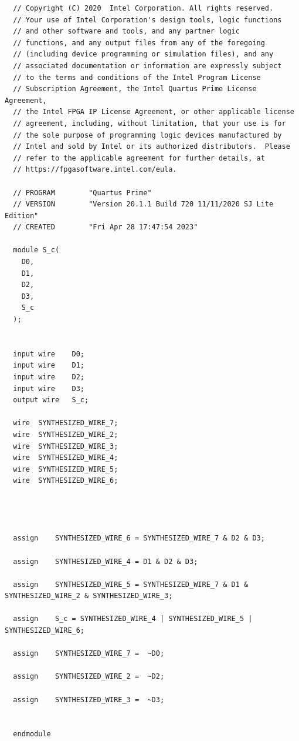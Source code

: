 \documentclass{article}
\begin{document}
\begin{lstlisting}
  // Copyright (C) 2020  Intel Corporation. All rights reserved.
  // Your use of Intel Corporation's design tools, logic functions 
  // and other software and tools, and any partner logic 
  // functions, and any output files from any of the foregoing 
  // (including device programming or simulation files), and any 
  // associated documentation or information are expressly subject 
  // to the terms and conditions of the Intel Program License 
  // Subscription Agreement, the Intel Quartus Prime License Agreement,
  // the Intel FPGA IP License Agreement, or other applicable license
  // agreement, including, without limitation, that your use is for
  // the sole purpose of programming logic devices manufactured by
  // Intel and sold by Intel or its authorized distributors.  Please
  // refer to the applicable agreement for further details, at
  // https://fpgasoftware.intel.com/eula.
  
  // PROGRAM		"Quartus Prime"
  // VERSION		"Version 20.1.1 Build 720 11/11/2020 SJ Lite Edition"
  // CREATED		"Fri Apr 28 17:47:54 2023"
  
  module S_c(
    D0,
    D1,
    D2,
    D3,
    S_c
  );
  
  
  input wire	D0;
  input wire	D1;
  input wire	D2;
  input wire	D3;
  output wire	S_c;
  
  wire	SYNTHESIZED_WIRE_7;
  wire	SYNTHESIZED_WIRE_2;
  wire	SYNTHESIZED_WIRE_3;
  wire	SYNTHESIZED_WIRE_4;
  wire	SYNTHESIZED_WIRE_5;
  wire	SYNTHESIZED_WIRE_6;
  
  
  
  
  assign	SYNTHESIZED_WIRE_6 = SYNTHESIZED_WIRE_7 & D2 & D3;
  
  assign	SYNTHESIZED_WIRE_4 = D1 & D2 & D3;
  
  assign	SYNTHESIZED_WIRE_5 = SYNTHESIZED_WIRE_7 & D1 & SYNTHESIZED_WIRE_2 & SYNTHESIZED_WIRE_3;
  
  assign	S_c = SYNTHESIZED_WIRE_4 | SYNTHESIZED_WIRE_5 | SYNTHESIZED_WIRE_6;
  
  assign	SYNTHESIZED_WIRE_7 =  ~D0;
  
  assign	SYNTHESIZED_WIRE_2 =  ~D2;
  
  assign	SYNTHESIZED_WIRE_3 =  ~D3;
  
  
  endmodule
    
\end{lstlisting}
\end{document}
